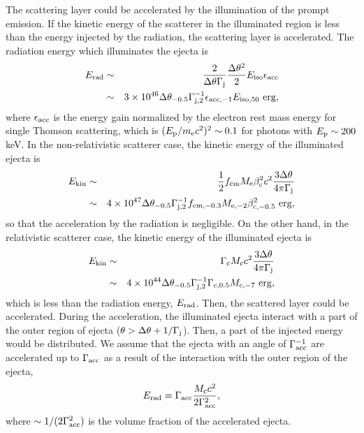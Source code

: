 \documentclass{emulateapj}
\begin{document}
The scattering layer could be accelerated by the illumination of the prompt emission.
If the kinetic energy of the scatterer in the illuminated region is less than
the energy injected by the radiation,
the scattering layer is accelerated. 
The radiation energy which illuminates the ejecta is
\begin{eqnarray}
E_{\rm rad}&\sim&\frac{2}{\Delta\theta\Gamma_{\rm j}}\frac{\Delta\theta^2}{2}E_{\rm iso}\epsilon_{\rm acc} \nonumber \\
&\sim&3\times10^{46}\Delta\theta_{-0.5}\Gamma_{\rm j,2}^{-1}\epsilon_{\rm acc,-1}E_{\rm iso,50}~{\rm erg},
\end{eqnarray}
where $\epsilon_{\rm acc}$ is the energy gain normalized
by the electron rest mass energy for single Thomson scattering, 
which is $(E_{\rm p}/m_{\rm e}c^2)^2\sim0.1$ for photons with $E_{\rm p}\sim200$ keV.
In the non-relativistic scatterer case, the kinetic energy of the illuminated ejecta is 
\begin{eqnarray}
E_{\rm kin}&\sim&\frac{1}{2}f_{\rm cm}M_{\rm e}\beta_{\rm c}^2c^2\frac{3\Delta\theta}{4\pi\Gamma_{\rm j}} \nonumber \\
&\sim&4\times10^{47}\Delta\theta_{-0.5}\Gamma_{\rm j,2}^{-1}f_{\rm cm,-0.3}M_{\rm e,-2}\beta_{\rm c,-0.5}^2~{\rm erg}, 
\end{eqnarray}
so that the acceleration by the radiation is negligible.
On the other hand, in the relativistic scatterer case,
the kinetic energy of the illuminated ejecta is 
\begin{eqnarray}
E_{\rm kin}&\sim&\Gamma_{\rm c}M_{\rm c}c^2\frac{3\Delta\theta}{4\pi\Gamma_{\rm j}} \nonumber \\
&\sim&4\times10^{44}\Delta\theta_{-0.5}\Gamma_{\rm j,2}^{-1}\Gamma_{\rm c,0.5}M_{\rm c,-7}~{\rm erg}, 
\end{eqnarray}
which is less than the radiation energy, $E_{\rm rad}$. 
Then, the scattered layer could be accelerated. 
During the acceleration, the illuminated ejecta interact with a part of the outer region of ejecta
($\theta>\Delta\theta+1/\Gamma_{\rm j}$).
Then, a part of the injected energy would be distributed.
We assume that the ejecta with an angle of $\Gamma_{\rm acc}^{-1}$ are accelerated
up to $\Gamma_{\rm acc}$ as a result of the interaction with the outer region of the ejecta,
\begin{eqnarray}
E_{\rm rad}=\Gamma_{\rm acc}\frac{M_{\rm c}c^2}{2\Gamma_{\rm acc}^2},
\end{eqnarray}
where $\sim 1/(2\Gamma_{\rm acc}^2)$ is the volume fraction of the accelerated ejecta. 
\end{document}
